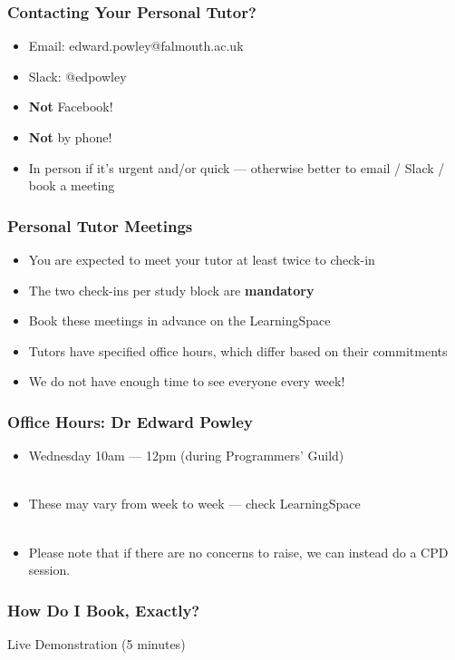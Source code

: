 \begin{frame}
	\frametitle{Contacting Your Personal Tutor?}	
	
	\begin{itemize}
		\item Email: edward.powley@falmouth.ac.uk
		\item Slack: @edpowley
		\item \textbf{Not} Facebook!
		\item \textbf{Not} by phone!
		\item In person if it's urgent and/or quick --- otherwise better to email / Slack / book a meeting
	\end{itemize}
\end{frame}

\begin{frame}
	\frametitle{Personal Tutor Meetings}	
	\begin{itemize}
		\item You are expected to meet your tutor at least twice to check-in
		\item The two check-ins per study block are \textbf{mandatory}
		\item Book these meetings in advance on the LearningSpace
		
		\item Tutors have specified office hours, which differ based on their commitments
		\item We do not have enough time to see everyone every week! 
	\end{itemize}
\end{frame}

\begin{frame}
	\frametitle{Office Hours: Dr Edward Powley}	
	\begin{itemize}
		\item Wednesday 10am --- 12pm (during Programmers' Guild)
		\\~\\
		\item These may vary from week to week --- check LearningSpace
		\\~\\
		\item Please note that if there are no concerns to raise, we can instead do a CPD session.
	\end{itemize}
\end{frame}

\begin{frame}
	\frametitle{How Do I Book, Exactly?}	
	\begin{center}
		Live Demonstration (5 minutes)
	\end{center}
\end{frame}

